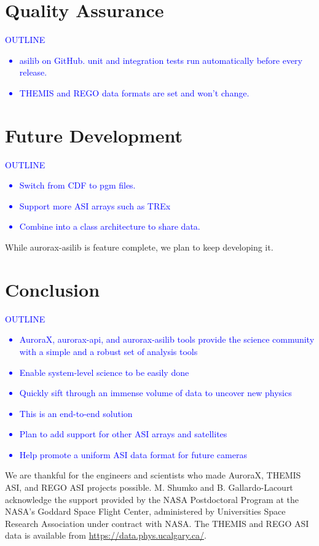 \documentclass[draft]{agujournal2019}
\begin{document}
\section{Quality Assurance}
\textcolor{blue}{
      OUTLINE
      \begin{itemize}
            \item asilib on GitHub. unit and integration tests run automatically before every release.
            \item THEMIS and REGO data formats are set and won't change.
      \end{itemize}
}

\section{Future Development}
\textcolor{blue}{
      OUTLINE
      \begin{itemize}
            \item Switch from CDF to pgm files.
            \item Support more ASI arrays such as TREx
            \item Combine into a class architecture to share data.
      \end{itemize}
}
While aurorax-asilib is feature complete, we plan to keep developing it.

\section{Conclusion}

\textcolor{blue}{
      OUTLINE
      \begin{itemize}
            \item AuroraX, aurorax-api, and aurorax-asilib tools provide the science community with a simple and a robust set of analysis tools
            \item Enable system-level science to be easily done
            \item Quickly sift through an immense volume of data to uncover new physics
            \item This is an end-to-end solution
            \item Plan to add support for other ASI arrays and satellites
            \item Help promote a uniform ASI data format for future cameras
      \end{itemize}
}

\acknowledgments
We are thankful for the engineers and scientists who made AuroraX, THEMIS ASI, and REGO ASI projects possible. M. Shumko and B. Gallardo-Lacourt acknowledge the support provided by the NASA Postdoctoral Program at the NASA’s Goddard Space Flight Center, administered by Universities Space Research Association under contract with NASA. The THEMIS and REGO ASI data is available from \url{https://data.phys.ucalgary.ca/}.

% 
\end{document}
